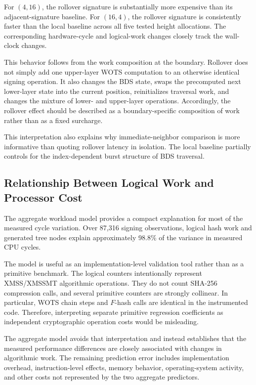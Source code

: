 \documentclass[pdflatex,sn-mathphys-num]{sn-jnl}
\begin{document}
For $(4,16)$, the rollover signature is substantially more expensive
than its adjacent-signature baseline. For $(16,4)$, the rollover
signature is consistently faster than the local baseline across all
five tested height allocations. The corresponding hardware-cycle and
logical-work changes closely track the wall-clock changes.

This behavior follows from the work composition at the boundary.
Rollover does not simply add one upper-layer WOTS computation to an
otherwise identical signing operation. It also changes the BDS state,
swaps the precomputed next lower-layer state into the current position,
reinitializes traversal work, and changes the mixture of lower- and
upper-layer operations. Accordingly, the rollover effect should be
described as a boundary-specific composition of work rather than as a
fixed surcharge.

This interpretation also explains why immediate-neighbor comparison is
more informative than quoting rollover latency in isolation. The local
baseline partially controls for the index-dependent burst structure of
BDS traversal.

\subsection{Relationship Between Logical Work and Processor Cost}
\label{sec:discussion_model}

The aggregate workload model provides a compact explanation for most of
the measured cycle variation. Over 87,316 signing observations, logical
hash work and generated tree nodes explain approximately 98.8\% of the
variance in measured CPU cycles.

The model is useful as an implementation-level validation tool rather
than as a primitive benchmark. The logical counters intentionally
represent XMSS/XMSSMT algorithmic operations. They do not count
SHA-256 compression calls, and several primitive counters are strongly
collinear. In particular, WOTS chain steps and $F$-hash calls are
identical in the instrumented code. Therefore, interpreting separate
primitive regression coefficients as independent cryptographic
operation costs would be misleading.

The aggregate model avoids that interpretation and instead establishes
that the measured performance differences are closely associated with
changes in algorithmic work. The remaining prediction error includes
implementation overhead, instruction-level effects, memory behavior,
operating-system activity, and other costs not represented by the two
aggregate predictors.
\end{document}

